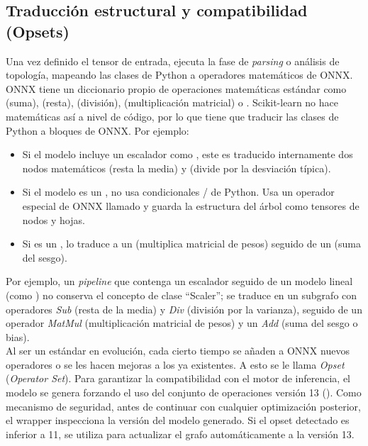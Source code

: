 \documentclass[a4paper,12pt,twoside,final]{book}
\begin{document}
\subsection{Traducción estructural y compatibilidad (Opsets)}
Una vez definido el tensor de entrada,  ejecuta la fase de \textit{parsing} o análisis de topología,
mapeando las clases de Python a operadores matemáticos de ONNX. ONNX tiene un diccionario propio de operaciones
matemáticas estándar como  (suma),  (resta),  (división),  (multiplicación
matricial) o . Scikit-learn no hace matemáticas así a nivel de código, por lo que  tiene que
traducir las clases de Python a bloques de ONNX. Por ejemplo:
\begin{itemize}
  \item Si el modelo incluye un escalador como , este es traducido internamente dos nodos
  matemáticos  (resta la media) y  (divide por la desviación típica).
  \item Si el modelo es un , no usa condicionales / de Python. Usa un operador
  especial de ONNX llamado  y guarda la estructura del árbol como tensores de nodos y
  hojas.
  \item Si es un , lo traduce a un  (multiplica matricial de pesos) seguido de un
   (suma del sesgo).
\end{itemize}

Por ejemplo, un \textit{pipeline} que contenga un
escalador seguido de un modelo lineal (como ) no conserva el concepto de clase ``Scaler''; se traduce en
un subgrafo con operadores \textit{Sub} (resta de la media) y \textit{Div} (división por la varianza), seguido de un
operador \textit{MatMul} (multiplicación matricial de pesos) y un \textit{Add} (suma del sesgo o bias).\\

Al ser un estándar en evolución, cada cierto tiempo se añaden a ONNX nuevos operadores o se les hacen mejoras a los ya
existentes. A esto se le llama \textit{Opset} (\textit{Operator Set}). Para garantizar la compatibilidad con el motor
de inferencia, el modelo se genera forzando el uso del conjunto de operaciones versión 13 ().
Como mecanismo de seguridad, antes de continuar con cualquier optimización posterior, el wrapper inspecciona la versión 
del modelo generado. Si el opset detectado es inferior a 11, se utiliza  para actualizar
el grafo automáticamente a la versión 13.
\end{document}

